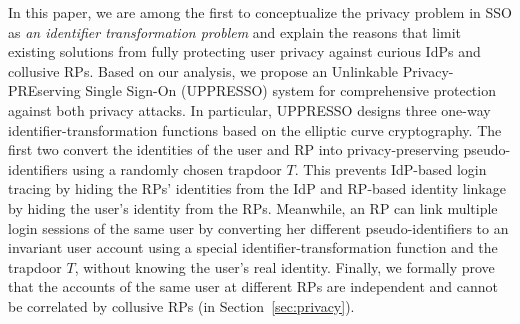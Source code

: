 In this paper, we are among the first to conceptualize the privacy problem in SSO as {\em an identifier transformation problem} and explain the reasons that limit existing solutions from fully protecting user privacy against curious IdPs and collusive RPs. Based on our analysis, we propose an Unlinkable Privacy-PREserving Single Sign-On (UPPRESSO) system for comprehensive protection against both privacy attacks. In particular, UPPRESSO designs three one-way identifier-transformation functions based on the elliptic curve cryptography. The first two convert the identities of the user and RP into privacy-preserving pseudo-identifiers using a randomly chosen trapdoor $T$. This prevents IdP-based login tracing by hiding the RPs' identities from the IdP and RP-based identity linkage by hiding the user's identity from the RPs. Meanwhile, an RP can link multiple login sessions of the same user by converting her different pseudo-identifiers to an invariant user account using a special identifier-transformation function and the trapdoor $T$, without knowing the user's real identity. Finally, we formally prove that the accounts of the same user at different RPs are independent and cannot be correlated by collusive RPs (in Section~\ref{sec:privacy}). 

